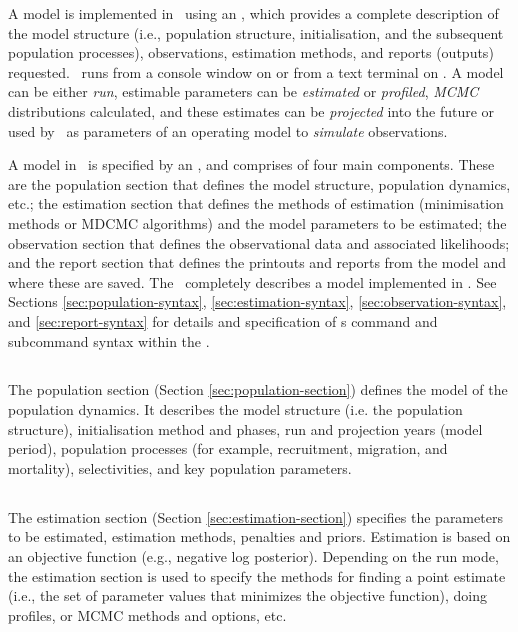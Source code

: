 A model is implemented in \CNAME\ using an \config {}, which provides a complete description of the model structure (i.e., population structure, initialisation, and the subsequent population processes), observations, estimation methods, and reports (outputs) requested. \CNAME\ runs from a console window on  or from a text terminal on . A model can be either \emph{run}, estimable parameters can be \emph{estimated} or \emph{profiled}, \emph{MCMC} distributions calculated, and these estimates can be \emph{projected} into the future or used by \CNAME\ as parameters of an operating model to \emph{simulate} observations.

A model in \CNAME\ is specified by an \config, and comprises of four main components. These are the population section that defines the model structure, population dynamics, etc.; the estimation section that defines the methods of estimation (minimisation methods or MDCMC algorithms) and the model parameters to be estimated; the observation section that defines the observational data and associated likelihoods; and the report section that defines the printouts and reports from the model and where these are saved. The \config\ completely describes a model implemented in \CNAME. See Sections \ref{sec:population-syntax}, \ref{sec:estimation-syntax}, \ref{sec:observation-syntax}, and \ref{sec:report-syntax} for details and specification of \CNAME s command and subcommand syntax within the \config. 

\subsection{}
The population section (Section \ref{sec:population-section}) defines the model of the population dynamics. It describes the model structure (i.e. the population structure), initialisation method and phases, run and projection years (model period), population processes (for example, recruitment, migration, and mortality), selectivities, and key population parameters.

\subsection{}
The estimation section (Section \ref{sec:estimation-section}) specifies the parameters to be estimated, estimation methods, penalties and priors. Estimation is based on an objective function (e.g., negative log posterior). Depending on the run mode, the estimation section is used to specify the methods for finding a point estimate (i.e., the set of parameter values that minimizes the objective function), doing profiles, or MCMC methods and options, etc.

